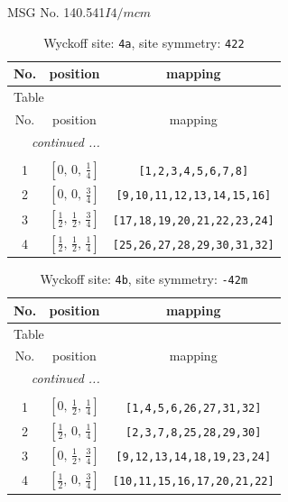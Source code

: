 \documentclass[fleqn,8pt]{jsarticle}
\begin{document}
\setcounter{MaxMatrixCols}{32}

\renewcommand{\tablename}{Table~}
\renewcommand{\figurename}{Figure~}
\begin{center}
\LARGE
MSG No. 140.541\quad$I4/mcm$
\end{center}
\renewcommand{\arraystretch}{1.2}
\begin{longtable}{ccc}
\caption{Wyckoff site: {\tt 4a}, site symmetry: {\tt 422}}
 \\
 \hline \hline
No. & position & mapping \\ \hline \endfirsthead

\multicolumn{2}{l}{\tablename\ \thetable{}} \\
 \hline \hline
No. & position & mapping \\ \hline \endhead

 \hline \hline
\multicolumn{2}{r}{\footnotesize\it continued ...} \\ \endfoot

 \hline \hline
\multicolumn{2}{r}{} \\ \endlastfoot

1 & $\left[ 0,\, 0,\, \frac{1}{4} \right]$ & {\tt [1,2,3,4,5,6,7,8]} \\ \hline
2 & $\left[ 0,\, 0,\, \frac{3}{4} \right]$ & {\tt [9,10,11,12,13,14,15,16]} \\ \hline
3 & $\left[ \frac{1}{2},\, \frac{1}{2},\, \frac{3}{4} \right]$ & {\tt [17,18,19,20,21,22,23,24]} \\ \hline
4 & $\left[ \frac{1}{2},\, \frac{1}{2},\, \frac{1}{4} \right]$ & {\tt [25,26,27,28,29,30,31,32]} \\
\end{longtable}
\renewcommand{\arraystretch}{1.2}
\begin{longtable}{ccc}
\caption{Wyckoff site: {\tt 4b}, site symmetry: {\tt -42m}}
 \\
 \hline \hline
No. & position & mapping \\ \hline \endfirsthead

\multicolumn{2}{l}{\tablename\ \thetable{}} \\
 \hline \hline
No. & position & mapping \\ \hline \endhead

 \hline \hline
\multicolumn{2}{r}{\footnotesize\it continued ...} \\ \endfoot

 \hline \hline
\multicolumn{2}{r}{} \\ \endlastfoot

1 & $\left[ 0,\, \frac{1}{2},\, \frac{1}{4} \right]$ & {\tt [1,4,5,6,26,27,31,32]} \\ \hline
2 & $\left[ \frac{1}{2},\, 0,\, \frac{1}{4} \right]$ & {\tt [2,3,7,8,25,28,29,30]} \\ \hline
3 & $\left[ 0,\, \frac{1}{2},\, \frac{3}{4} \right]$ & {\tt [9,12,13,14,18,19,23,24]} \\ \hline
4 & $\left[ \frac{1}{2},\, 0,\, \frac{3}{4} \right]$ & {\tt [10,11,15,16,17,20,21,22]} \\
\end{longtable}
\end{document}
